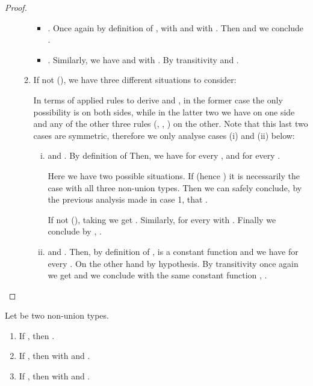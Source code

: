 \begin{proof}
\begin{itemize}
\begin{enumerate}
\begin{itemize}
	  \item . Once again by definition of
	  ,  with  and  with . Then  and we conclude .
	  
	  \item . Similarly, we have  and  with
	  . By transitivity
	   and .
  \end{itemize}
  
	\item If not (\ie ), we have three different situations to
	consider:
    In terms of applied rules to derive  and , in the former case the only possibility is  on both
    sides, while in the latter two we have  on one side and any
    of the other three rules (, ,
    ) on the other. Note that this last two cases are symmetric,
    therefore we only analyse cases (i) and (ii) below:
    \begin{enumerate}[(i)]
      \item  and . By definition of  
      Then, we have  for every , and  for every .
      
      Here we have two possible situations. If  (hence ) it
      is necessarily the case  with all three non-union types. Then we can
      safely conclude, by the previous analysis made in case 1, that
      .
      
      If not (\ie ), taking  we
      get .
      Similarly,  for every  with . Finally we conclude by ,
      .

      \item  and . Then, by definition of ,
       is a constant function and we have  for every . On the other hand
       by hypothesis. By transitivity
      once again we get 
      and we conclude with the same constant function , .
    \end{enumerate}
  \end{enumerate}
\end{itemize}
\end{proof}



\begin{lemma}
\label{lem:equalityIsInvertible}
Let  be two non-union types.
\begin{enumerate}
  \item If , then .
  \item If , then 
  with  and .
  \item If , then 
  with  and .
\end{enumerate}
\end{lemma}

